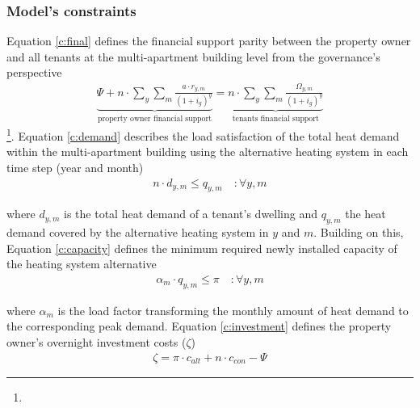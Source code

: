 \subsubsection{Model's constraints}
Equation \ref{c:final} defines the financial support parity between the property owner and all tenants at the multi-apartment building level from the governance's perspective 
\begin{align}\label{c:final}
	\underbrace{\Psi +  n \cdot \sum_{y} \sum_{m} \frac{a \cdot r_{y,m}}{(1+i_{g})^y}}_{\text{property owner financial support}}= \underbrace{n \cdot \sum_{y} \sum_{m} \frac{\Omega_{y,m}}{(1+i_{g})^y}}_{\text{tenants financial support}}
\end{align}
\footnote{}. Equation \ref{c:demand} describes the load satisfaction of the total heat demand within the multi-apartment building using the alternative heating system in each time step (year and month) 
\begin{align}\label{c:demand}
n \cdot d_{y,m} \leq q_{y,m} \quad :\forall y,m
\end{align}

where $d_{y,m}$ is the total heat demand of a tenant's dwelling and $q_{y,m}$ the heat demand covered by the alternative heating system in $y$ and $m$. Building on this, Equation \ref{c:capacity} defines the minimum required newly installed capacity of the heating system alternative
\begin{align}\label{c:capacity}
\alpha_{m} \cdot q_{y,m} \leq \pi \quad :\forall y,m
\end{align}

where $\alpha_{m}$ is the load factor transforming the monthly amount of heat demand to the corresponding peak demand. Equation \ref{c:investment} defines the property owner's overnight investment costs ($\zeta$)
\begin{align}\label{c:investment}
\zeta = \pi \cdot c_{alt} + n \cdot c_{con} - \Psi
\end{align}

